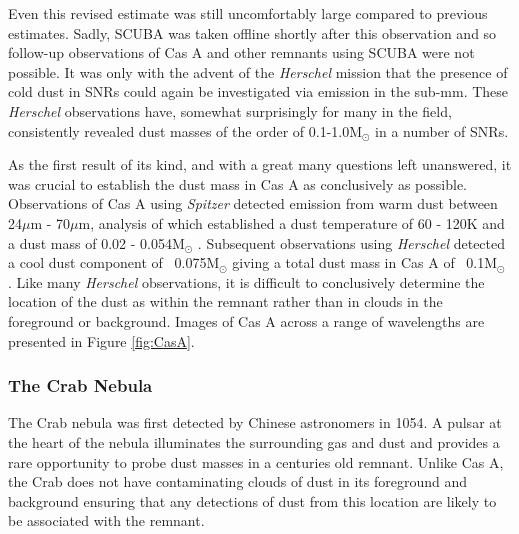 Even this revised estimate was still uncomfortably large compared to previous estimates.  Sadly, SCUBA was taken offline shortly after this observation and so follow-up observations of Cas A and other remnants using SCUBA were not possible.  It was only with the advent of the \textit{Herschel} mission that the presence of cold dust in SNRs could again be investigated via emission in the sub-mm.  These \textit{Herschel} observations have, somewhat surprisingly for many in the field, consistently revealed dust masses of the order of 0.1-1.0M$_{\odot}$ in a number of SNRs.



As the first result of its kind, and with a great many questions left unanswered, it was crucial to establish the dust mass in Cas A as conclusively as possible.   Observations of Cas A using \textit{Spitzer} detected emission from warm dust between 24$\mu$m - 70$\mu$m, analysis of which established a dust temperature of 60 - 120K and a dust mass of 0.02 - 0.054M$_{\odot}$ \citep{Rho2008}.  Subsequent observations using \textit{Herschel} detected a cool dust component of ~0.075M$_{\odot}$ giving a total dust mass in Cas A of ~0.1M$_{\odot}$ \citep{Barlow2010}.  Like many {\em Herschel} observations, it is difficult to conclusively determine the location of the dust as within the remnant rather than in clouds in the foreground or background.  Images of Cas A across a range of wavelengths are presented in Figure \ref{fig:CasA}.  

\subsubsection{The Crab Nebula}

The Crab nebula was first detected by Chinese astronomers in 1054.  A pulsar at the heart of the nebula illuminates the surrounding gas and dust and provides a rare opportunity to probe dust masses in a centuries old remnant.  Unlike Cas A, the Crab does not have contaminating clouds of dust in its foreground and background ensuring that any detections of dust from this location are likely to be associated with the remnant.
 

